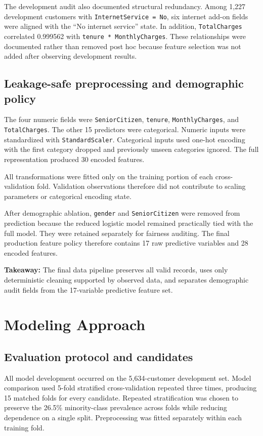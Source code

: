 \documentclass[11pt]{article}
\newcommand{\takeaway}[1]{\vspace{1pt}\noindent\textbf{Takeaway:} #1\vspace{3pt}}
\newcommand{\code}[1]{\texttt{#1}}
\begin{document}
The development audit also documented structural redundancy. Among 1,227 development customers with \code{InternetService = No}, six internet add-on fields were aligned with the ``No internet service'' state. In addition, \code{TotalCharges} correlated 0.999562 with \code{tenure * MonthlyCharges}. These relationships were documented rather than removed post hoc because feature selection was not added after observing development results.

\subsection{Leakage-safe preprocessing and demographic policy}

The four numeric fields were \code{SeniorCitizen}, \code{tenure}, \code{MonthlyCharges}, and \code{TotalCharges}. The other 15 predictors were categorical. Numeric inputs were standardized with \code{StandardScaler}. Categorical inputs used one-hot encoding with the first category dropped and previously unseen categories ignored. The full representation produced 30 encoded features.

All transformations were fitted only on the training portion of each cross-validation fold. Validation observations therefore did not contribute to scaling parameters or categorical encoding state.

After demographic ablation, \code{gender} and \code{SeniorCitizen} were removed from prediction because the reduced logistic model remained practically tied with the full model. They were retained separately for fairness auditing. The final production feature policy therefore contains 17 raw predictive variables and 28 encoded features.

\takeaway{The final data pipeline preserves all valid records, uses only deterministic cleaning supported by observed data, and separates demographic audit fields from the 17-variable predictive feature set.}

\section{Modeling Approach}

\subsection{Evaluation protocol and candidates}

All model development occurred on the 5,634-customer development set. Model comparison used 5-fold stratified cross-validation repeated three times, producing 15 matched folds for every candidate. Repeated stratification was chosen to preserve the 26.5\% minority-class prevalence across folds while reducing dependence on a single split. Preprocessing was fitted separately within each training fold.
\end{document}

